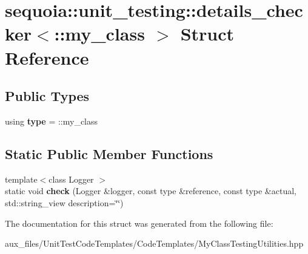 \hypertarget{structsequoia_1_1unit__testing_1_1details__checker_3_1_1my__class_01_4}{}\section{sequoia\+::unit\+\_\+testing\+::details\+\_\+checker$<$\+::my\+\_\+class $>$ Struct Reference}
\label{structsequoia_1_1unit__testing_1_1details__checker_3_1_1my__class_01_4}
\subsection*{Public Types}
\begin{DoxyCompactItemize}
\item 
\mbox{\label{structsequoia_1_1unit__testing_1_1details__checker_3_1_1my__class_01_4_a1164f4a046941ce1469b8ff610d0f325}} 
using {\bfseries type} = \+::my\+\_\+class
\end{DoxyCompactItemize}
\subsection*{Static Public Member Functions}
\begin{DoxyCompactItemize}
\item 
\mbox{\label{structsequoia_1_1unit__testing_1_1details__checker_3_1_1my__class_01_4_a151653ef83bb25e2a8c8fc8eb3763364}} 
{\footnotesize template$<$class Logger $>$ }\\static void {\bfseries check} (Logger \&logger, const type \&reference, const type \&actual, std\+::string\+\_\+view description=\char`\"{}\char`\"{})
\end{DoxyCompactItemize}


The documentation for this struct was generated from the following file\+:\begin{DoxyCompactItemize}
\item 
aux\+\_\+files/\+Unit\+Test\+Code\+Templates/\+Code\+Templates/My\+Class\+Testing\+Utilities.\+hpp\end{DoxyCompactItemize}
